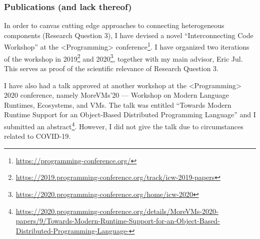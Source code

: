 \subsubsection{Publications (and lack thereof)}

In order to canvas cutting edge approaches to connecting heterogeneous
components (Research Question 3), I have devised a novel
``Interconnecting Code Workshop'' at the <Programming>
conference\footnote{\url{https://programming-conference.org/}}. I have
organized two iterations of the workshop in
2019\footnote{\url{https://2019.programming-conference.org/track/icw-2019-papers}}
and
2020\footnote{\url{https://2020.programming-conference.org/home/icw-2020}},
together with my main advisor, Eric Jul. This serves as proof of the
scientific relevance of Research Question 3.

I have also had a talk approved at another workshop at the
<Programming> 2020 conference, namely MoreVMs'20 --- Workshop on
Modern Language Runtimes, Ecosystems, and VMs. The talk was entitled
``Towards Modern Runtime Support for an Object-Based Distributed
Programming Language'' and I submitted an
abstract\footnote{\url{https://2020.programming-conference.org/details/MoreVMs-2020-papers/9/Towards-Modern-Runtime-Support-for-an-Object-Based-Distributed-Programming-Language-}}.
However, I did not give the talk due to circumstances related to
COVID-19. 
